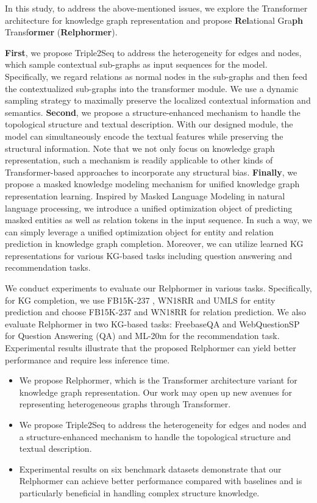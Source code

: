 \documentclass[sigconf]{acmart}
\begin{document}
 
In this study, to address the above-mentioned issues, we explore the Transformer architecture for knowledge graph representation and propose \textbf{Rel}ational Gra\textbf{ph} Transf\textbf{ormer} (\textbf{Relphormer}).


\textbf{First}, we propose Triple2Seq  to address the heterogeneity for edges and nodes, which sample contextual sub-graphs as input sequences for the model.
Specifically, we regard relations as normal nodes in the sub-graphs and then feed the contextualized sub-graphs into the transformer module.
We use a dynamic sampling strategy to maximally preserve the localized contextual information and semantics.
\textbf{Second}, we propose a structure-enhanced mechanism to handle the topological structure and textual description.
With our designed module, the model can simultaneously encode the textual features while preserving the structural information.
Note that we not only focus on knowledge graph representation, such a mechanism is readily applicable to other kinds of Transformer-based approaches to incorporate any structural bias.
\textbf{Finally}, we propose a masked knowledge modeling mechanism for unified knowledge graph representation learning.
Inspired by Masked Language Modeling in natural language processing, we introduce a unified optimization object of predicting masked entities as well as relation tokens in the input sequence. 
In such a way, we can simply leverage a unified optimization object for entity and relation prediction in knowledge graph completion.
Moreover, we can utilize learned KG representations for various KG-based tasks including question answering and recommendation tasks.

We conduct experiments to evaluate our Relphormer in various tasks.
Specifically, for KG completion, we use FB15K-237 \cite{FB15K237}, WN18RR \cite{WN18RR} and UMLS \cite{UMLS} for entity prediction and choose FB15K-237 and WN18RR for relation prediction.
We also evaluate Relphormer in two KG-based tasks: FreebaseQA \cite{FreebaseQA} and WebQuestionSP \cite{WebQuestionsSP} for Question Answering (QA) and ML-20m \cite{MovieLens} for the recommendation task.
Experimental results illustrate that the proposed Relphormer can yield better performance and require less inference time.



\begin{itemize}
    \item We propose Relphormer, which is the Transformer architecture variant for knowledge graph representation. 
    Our work may open up new avenues for representing heterogeneous graphs through Transformer. 
    
    \item We propose Triple2Seq  to address the heterogeneity for edges and nodes and a structure-enhanced mechanism to handle the topological structure and textual description.
    
    \item Experimental results on six benchmark datasets demonstrate that our Relphormer can achieve better performance compared with baselines and is particularly beneficial in handling complex structure knowledge.
\end{itemize}
\end{document}
